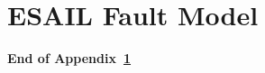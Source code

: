 \documentclass[11pt,twoside]{book}
\begin{document}













\newpage

\appendix


\chapter{ESAIL Fault Model}
\label{appendix:esailFM}


\textbf{End of Appendix~\ref{appendix:esailFM}}

   
\clearpage

\clearpage

\printindex



\end{document}
